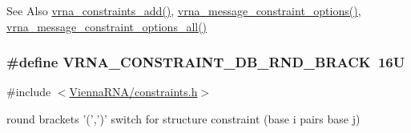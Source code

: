 \begin{DoxySeeAlso}{See Also}
\hyperlink{group__constraints_ga35a401f680969a556858a8dd5f1d07cc}{vrna\-\_\-constraints\-\_\-add()}, \hyperlink{group__constraints_gaa1f20b53bf09ac2e6b0dbb13f7d89670}{vrna\-\_\-message\-\_\-constraint\-\_\-options()}, \hyperlink{group__constraints_gaec7e13fa0465c2acc7a621d1aecb709f}{vrna\-\_\-message\-\_\-constraint\-\_\-options\-\_\-all()} 
\end{DoxySeeAlso}
\hypertarget{group__constraints_gac17b034852c914bc5879954c65d7e74b}{
\subsubsection[{V\-R\-N\-A\-\_\-\-C\-O\-N\-S\-T\-R\-A\-I\-N\-T\-\_\-\-D\-B\-\_\-\-R\-N\-D\-\_\-\-B\-R\-A\-C\-K}]{\setlength{\rightskip}{0pt plus 5cm}\#define V\-R\-N\-A\-\_\-\-C\-O\-N\-S\-T\-R\-A\-I\-N\-T\-\_\-\-D\-B\-\_\-\-R\-N\-D\-\_\-\-B\-R\-A\-C\-K~16\-U}}\label{group__constraints_gac17b034852c914bc5879954c65d7e74b}


{\ttfamily \#include $<$\hyperlink{constraints_8h}{Vienna\-R\-N\-A/constraints.\-h}$>$}



round brackets '(',')' switch for structure constraint (base i pairs base j) 

